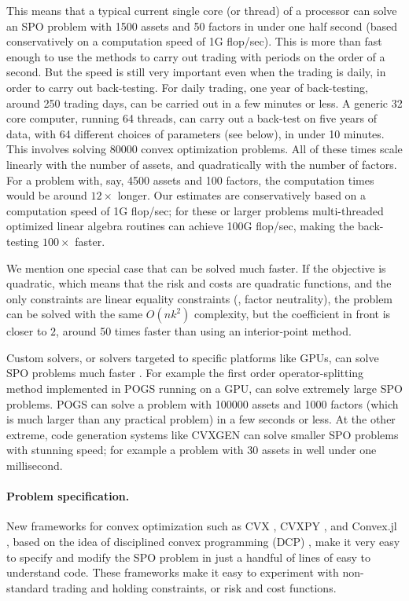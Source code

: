 \documentclass[openany]{article}  %
\begin{document}
This means that a typical current single core (or thread) of a processor can solve an
SPO problem with 1500 assets and 50 factors in under one half second
(based conservatively on a computation speed of 1G flop/sec).
This is more than fast enough to use the methods to carry out trading with
periods on the order of a second.  But the speed is still very
important even when the trading is daily, in order to carry out back-testing.
For daily trading, one year of back-testing, around 250 trading days, can be
carried out in a few minutes or less.  A generic 32 core computer, running 64 threads,
can carry out a back-test on five years of data, with 64 different choices of
parameters (see below), in under 10 minutes.  This involves solving 80000
convex optimization problems.
All of these times scale linearly with the number of assets, and quadratically with
the number of factors.  For a problem with, say, 4500 assets and 100 factors,
the computation times would be around $12 \times$ longer.
Our estimates are conservatively based on a computation speed of 1G flop/sec;
for these or larger problems multi-threaded optimized linear algebra routines can
achieve 100G flop/sec, making the back-testing $100 \times$ faster.

We mention one special case that can be solved much faster.  If the objective
is quadratic, which means that the risk and costs are quadratic functions,
and the only constraints are linear equality constraints (\eg,
factor neutrality), the problem can be solved with the same $O(nk^2)$ complexity,
but the coefficient in front is closer to $2$, around 50 times faster than
using an interior-point method.

Custom solvers, or solvers targeted to specific platforms like GPUs,
can solve SPO problems much faster \cite{ocpb:16}.
For example the first order operator-splitting method implemented in
POGS \cite{fougner2015pogs} running on a GPU, can solve extremely large
SPO problems.
POGS can solve a problem with 100000 assets and 1000 factors
(which is much larger than any practical problem) in a few seconds or less.
At the other extreme, code generation systems like CVXGEN \cite{mattingley2012cvxgen}
can solve smaller SPO problems with stunning speed; for example a problem
with 30 assets in well under one millisecond.

\paragraph{Problem specification.}
New frameworks for convex optimization such as
CVX \cite{fougner2015pogs}, CVXPY \cite{cvxpy}, and Convex.jl \cite{convexjl},
based on the idea of disciplined convex programming (DCP) \cite{grant2006dcp},
make it very easy to specify and modify the SPO problem in just a handful
of lines of easy to understand code.   These frameworks make it
easy to experiment with non-standard trading and holding constraints,
or risk and cost functions.
\end{document}
